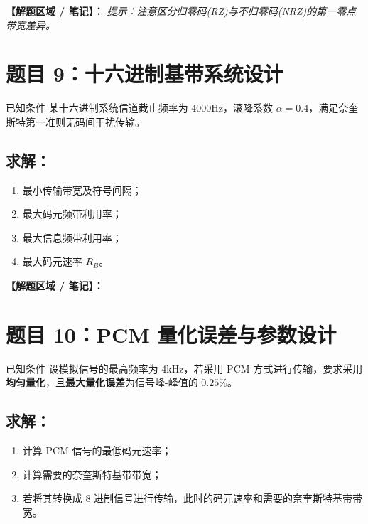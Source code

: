 \documentclass[12pt, a4paper]{article}
\begin{document}
	\noindent\textbf{【解题区域 / 笔记】：}
	\textit{提示：注意区分归零码(RZ)与不归零码(NRZ)的第一零点带宽差异。}
	
	\newpage
	
	\section*{题目 9：十六进制基带系统设计}
	
	\begin{problembox}{已知条件}
		某十六进制系统信道截止频率为 4000Hz，滚降系数 $\alpha=0.4$，满足奈奎斯特第一准则无码间干扰传输。
	\end{problembox}
	
	\subsection*{求解：}
	\begin{enumerate}[label=(\arabic*)]
		\item 最小传输带宽及符号间隔；
		\item 最大码元频带利用率；
		\item 最大信息频带利用率；
		\item 最大码元速率 $R_B$。
	\end{enumerate}
	
	\noindent\textbf{【解题区域 / 笔记】：}
	
	\newpage
	
	\section*{题目 10：PCM 量化误差与参数设计}
	
	\begin{problembox}{已知条件}
		设模拟信号的最高频率为 4kHz，若采用 PCM 方式进行传输，要求采用\textbf{均匀量化}，且\textbf{最大量化误差}为信号峰-峰值的 $0.25\%$。
	\end{problembox}
	
	\subsection*{求解：}
	\begin{enumerate}[label=(\arabic*)]
		\item 计算 PCM 信号的最低码元速率；
		\item 计算需要的奈奎斯特基带带宽；
		\item 若将其转换成 8 进制信号进行传输，此时的码元速率和需要的奈奎斯特基带带宽。
	\end{enumerate}
	
\end{document}
